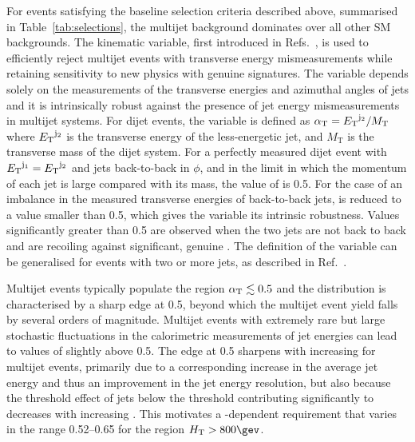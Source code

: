 For events satisfying the baseline selection criteria described above,
summarised in Table~\ref{tab:selections}, the multijet background
dominates over all other SM backgrounds. The \alphat kinematic
variable, first introduced in Refs.~\cite{Randall:2008rw, RA1Paper},
is used to efficiently reject multijet events with transverse energy
mismeasurements while retaining sensitivity to new physics with
genuine \ptvecmiss signatures. The variable \alphat depends solely on the
measurements of the transverse energies and azimuthal angles of jets
and it is intrinsically robust against the presence of jet energy
mismeasurements in multijet systems. For dijet events, the \alphat
variable is defined as $\alpha_{\text{T}} = {E_{\text T}}^{\rm j_2}/M_\text{T}$ where
${E_{\text T}}^{\rm j_2}$ is the transverse energy of the less-energetic jet,
and $M_\text{T}$ is the transverse mass of the dijet system.  For a
perfectly measured dijet event with ${E_{\text T}}^{\mathrm{j}_1} =
{E_{\text T}}^{\mathrm{j}_2}$ and jets back-to-back in $\phi$, and in the limit
in which the momentum of each jet is large compared with its mass, the
value of \alphat is 0.5. For the case of an imbalance in the measured
transverse energies of back-to-back jets, \alphat is reduced to a
value smaller than 0.5, which gives the variable its intrinsic
robustness. Values significantly greater than 0.5 are observed when
the two jets are not back to back and are recoiling against
significant, genuine \ptvecmiss. The definition of the \alphat variable
can be generalised for events with two or more jets, as described in
Ref.~\cite{RA1Paper2012}.

Multijet events typically populate the region $\alpha_{\text{T}} \lesssim 0.5$
and the \alphat distribution is characterised by a sharp edge at 0.5,
beyond which the multijet event yield falls by several orders of
magnitude. Multijet events with extremely rare but large stochastic
fluctuations in the calorimetric measurements of jet energies can lead
to values of \alphat slightly above 0.5. The edge at 0.5 sharpens with
increasing \scalht for multijet events, primarily due to a
corresponding increase in the average jet energy and thus an
improvement in the jet energy resolution, but also because the
threshold effect of jets below the \Pt threshold contributing
significantly to \mht decreases with increasing \scalht. This
motivates a \scalht-dependent \alphat requirement that varies in the
range 0.52--0.65 for the region $\scalht > 800\gev$. 

